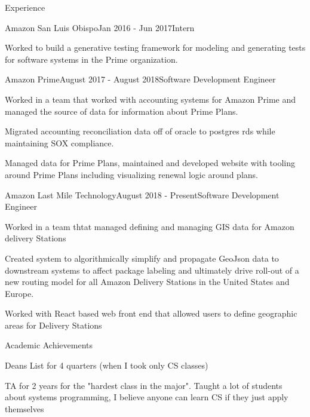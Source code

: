 \documentclass{resume} %
\begin{document}
\begin{rSection}{Experience}

\begin{rSubsection}{Amazon San Luis Obispo}{Jan 2016 - Jun 2017}{Intern}{}
\item Worked to build a generative testing framework for modeling and generating tests for software systems in the Prime organization. 
\end{rSubsection}


\begin{rSubsection}{Amazon Prime}{August 2017 - August 2018}{Software Development Engineer}{}
\item Worked in a team that worked with accounting systems for Amazon Prime and managed the source of data for information about Prime Plans.
\item Migrated accounting reconciliation data off of oracle to postgres rds while maintaining SOX compliance.
\item Managed data for Prime Plans, maintained and developed website with tooling around Prime Plans including visualizing renewal logic around plans. 
\end{rSubsection}


\begin{rSubsection}{Amazon Last Mile Technology}{August 2018 - Present}{Software Development Engineer}{}
\item Worked in a team thtat managed defining and managing GIS data for Amazon delivery Stations 
\item Created system to algorithmically simplify and propagate GeoJson data to downstream systems to affect package labeling and ultimately drive roll-out of a new routing model for all Amazon Delivery Stations in the United States and Europe.
\item Worked with React based web front end that allowed users to define geographic areas for Delivery Stations
\end{rSubsection}
\end{rSection}


\begin{rSection}{Academic Achievements} \itemsep -2pt
\item Deans List for 4 quarters (when I took only CS classes)
\item TA for 2 years for the "hardest class in the major". Taught a lot of students about systems programming, I believe anyone can learn CS if they just apply themselves
\item 
\end{rSection}
\end{document}
